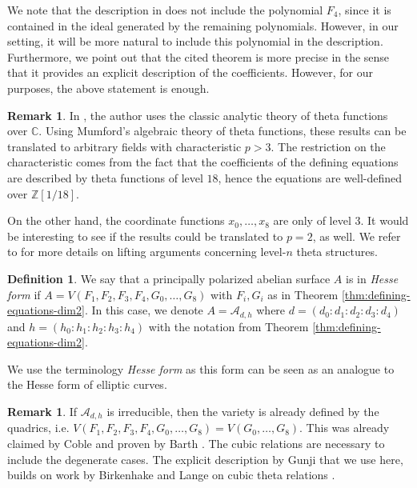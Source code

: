 \documentclass[11pt]{amsart}
\theoremstyle{definition}
\newtheorem{definition}[theorem]{Definition}
\newtheorem{remark}[theorem]{Remark}
\newcommand{\A}{\mathcal{A}}
\newcommand{\ZZ}{\mathbb{Z}}
\newcommand{\CC}{\mathbb{C}}
\begin{document}
We note that the description in \cite[Theorem 8.3]{gunji2006defining} does not include the polynomial $F_4$, since it is contained in the ideal generated by the remaining polynomials. However, in our setting, it will be more natural to include this polynomial in the description. Furthermore, we point out that the cited theorem is more precise in the sense that it provides an explicit description of the coefficients. However, for our purposes, the above statement is enough.

\begin{remark}
    In \cite{gunji2006defining}, the author uses the classic analytic theory of theta functions over $\CC$. Using Mumford's algebraic theory of theta functions, these results can be translated to arbitrary fields with characteristic $p>3$. The restriction on the characteristic comes from the fact that the coefficients of the defining equations are described by theta functions of level $18$, hence the equations are well-defined over $\ZZ[1/{18}]$.

    On the other hand, the coordinate functions $x_0, \dots , x_8$ are only of level $3$. It would be interesting to see if the results could be translated to $p=2$, as well.
    We refer to \cite[Section 2.3.6]{robert2021theory} for more details on lifting arguments concerning level-$n$ theta structures.
\end{remark}

\begin{definition} \label{def:hessian-form-av}
    We say that a principally polarized abelian surface $A$ is in {\em Hesse form} if
    \(
    A = V(F_1,F_2,F_3,F_4,G_0,\dots, G_8)
    \) with $F_i, G_i$ as in Theorem  \ref{thm:defining-equations-dim2}. In this case, we denote $A = \A_{d,h}$ where $d = (d_0:d_1:d_2:d_3:d_4)$ and $h = (h_0: h_1:h_2:h_3:h_4)$ with the notation from Theorem \ref{thm:defining-equations-dim2}.
\end{definition}

We use the terminology {\em Hesse form} as this form can be seen as an analogue to the Hesse form of elliptic curves. 

\begin{remark}
 If $\A_{d,h}$ is irreducible, then the variety is already defined by the quadrics, i.e. $V(F_1,F_2,F_3,F_4,G_0,\dots, G_8) = V(G_0,\dots, G_8)$. This was already claimed by Coble \cite{coble1917point} and proven by Barth \cite{barth1995quadratic}. The cubic relations are necessary to include the degenerate cases. The explicit description by Gunji \cite{gunji2006defining} that we use here, builds on work by Birkenhake and Lange on cubic theta relations \cite{birkenhake1990cubic}.
\end{remark}
\end{document}
